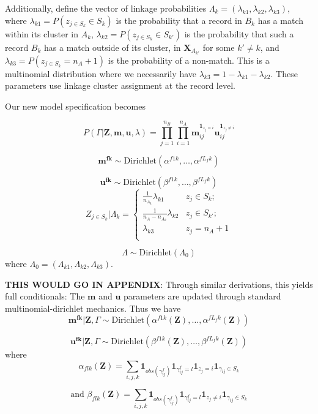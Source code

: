 \documentclass[
  12pt,
]{article}
\begin{document}
Additionally, define the vector of linkage probabilities
\(\Lambda_k = (\lambda_{k1}, \lambda_{k2}, \lambda_{k3})\), where
\(\lambda_{k1} = P(z_{j\in S_k} \in S_k)\) is the probability that a
record in \(B_k\) has a match within its cluster in \(A_k\),
\(\lambda_{k2} = P(z_{j \in S_k} \in S_{k'})\) is the probability that
such a record \(B_k\) has a match outside of its cluster, in
\(\mathbf{X}_{A_{k'}}\) for some \(k' \neq k\), and
\(\lambda_{k3} = P(z_{j\in S_k} = n_A + 1)\) is the probability of a
non-match. This is a multinomial distribution where we necessarily have
\(\lambda_{k3} = 1 - \lambda_{k1} - \lambda_{k2}\). These parameters use
linkage cluster assignment at the record level.

Our new model specification becomes

\[P(\Gamma|\mathbf{Z}, \mathbf{m}, \mathbf{u}, \lambda) =\prod_{j=1}^{n_B}  \prod_{i=1}^{n_A}\mathbf{m}_{ij}^{\mathbf{1}_{z_j = i}}\mathbf{u}_{ij}^{\mathbf{1}_{z_j \neq i}}\]

\[\mathbf{m^{fk}} \sim \text{Dirichlet}(\alpha^{f1k}, \ldots, \alpha^{fL_fk})\]

\[\mathbf{u^{fk}} \sim \text{Dirichlet}(\beta^{f1k}, \ldots, \beta^{fL_fk})\]
\[Z_{j \in S_k} | \Lambda_k =
\begin{cases} 
    \frac{1}{n_{A_k}}\lambda_{k1}  & z_j \in S_k; \\
    \frac{1}{n_A - n_{A_k}}\lambda_{k2}  & z_j \in S_{k'}; \\
     \lambda_{k3} & z_j = n_A + 1 \\
\end{cases}\]

\[\Lambda \sim \text{Dirichlet}(\Lambda_0)\] where
\(\Lambda_0 = (\Lambda_{k1}, \Lambda_{k2}, \Lambda_{k3}).\)

\textbf{THIS WOULD GO IN APPENDIX}: Through similar derivations, this
yields full conditionals: The \(\mathbf{m}\) and \(\mathbf{u}\)
parameters are updated through standard multinomial-dirichlet mechanics.
Thus we have
\[\mathbf{m^{fk}}|\mathbf{Z}, \Gamma \sim \text{Dirichlet}(\alpha^{f1k}(\mathbf{Z}), \ldots, \alpha^{fL_fk}(\mathbf{Z}))\]

\[\mathbf{u^{fk}}|\mathbf{Z}, \Gamma \sim \text{Dirichlet}(\beta^{f1k}(\mathbf{Z}), \ldots, \beta^{fL_fk}(\mathbf{Z}))\]
where
\[\alpha_{flk}(\mathbf{Z})= \sum_{i,j, k} \mathbf{1}_{obs(\gamma_{ij}^f)}\mathbf{1}_{\gamma_{ij}^f = l} \mathbf{1}_{z_j = i}\mathbf{1}_{\gamma_{ij} \in S_k}\]

\[\text{and } \beta_{flk}(\mathbf{Z})= \sum_{i,j, k} \mathbf{1}_{obs(\gamma_{ij}^f)}\mathbf{1}_{\gamma_{ij}^f = l} \mathbf{1}_{z_j \neq i}\mathbf{1}_{\gamma_{ij} \in S_k}\]
\end{document}
